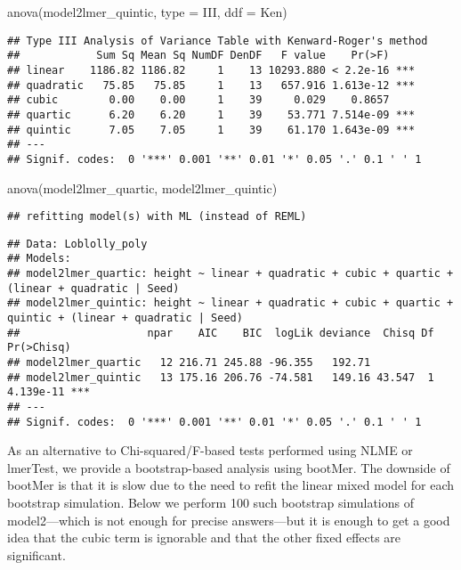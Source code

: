 \documentclass[
]{book}
\newenvironment{Shaded}{\begin{snugshade}}{\end{snugshade}}
\newcommand{\AttributeTok}[1]{\textcolor[rgb]{0.77,0.63,0.00}{#1}}
\newcommand{\FunctionTok}[1]{\textcolor[rgb]{0.00,0.00,0.00}{#1}}
\newcommand{\NormalTok}[1]{#1}
\newcommand{\StringTok}[1]{\textcolor[rgb]{0.31,0.60,0.02}{#1}}
\begin{document}
\begin{Shaded}
\begin{Highlighting}[]
\FunctionTok{anova}\NormalTok{(model2lmer\_quintic, }\AttributeTok{type =} \StringTok{\textquotesingle{}III\textquotesingle{}}\NormalTok{, }\AttributeTok{ddf =} \StringTok{\textquotesingle{}Ken\textquotesingle{}}\NormalTok{)}
\end{Highlighting}
\end{Shaded}

\begin{verbatim}
## Type III Analysis of Variance Table with Kenward-Roger's method
##            Sum Sq Mean Sq NumDF DenDF   F value    Pr(>F)    
## linear    1186.82 1186.82     1    13 10293.880 < 2.2e-16 ***
## quadratic   75.85   75.85     1    13   657.916 1.613e-12 ***
## cubic        0.00    0.00     1    39     0.029    0.8657    
## quartic      6.20    6.20     1    39    53.771 7.514e-09 ***
## quintic      7.05    7.05     1    39    61.170 1.643e-09 ***
## ---
## Signif. codes:  0 '***' 0.001 '**' 0.01 '*' 0.05 '.' 0.1 ' ' 1
\end{verbatim}

\begin{Shaded}
\begin{Highlighting}[]
\FunctionTok{anova}\NormalTok{(model2lmer\_quartic, model2lmer\_quintic)}
\end{Highlighting}
\end{Shaded}

\begin{verbatim}
## refitting model(s) with ML (instead of REML)
\end{verbatim}

\begin{verbatim}
## Data: Loblolly_poly
## Models:
## model2lmer_quartic: height ~ linear + quadratic + cubic + quartic + (linear + quadratic | Seed)
## model2lmer_quintic: height ~ linear + quadratic + cubic + quartic + quintic + (linear + quadratic | Seed)
##                    npar    AIC    BIC  logLik deviance  Chisq Df Pr(>Chisq)    
## model2lmer_quartic   12 216.71 245.88 -96.355   192.71                         
## model2lmer_quintic   13 175.16 206.76 -74.581   149.16 43.547  1  4.139e-11 ***
## ---
## Signif. codes:  0 '***' 0.001 '**' 0.01 '*' 0.05 '.' 0.1 ' ' 1
\end{verbatim}

As an alternative to Chi-squared/F-based tests performed using NLME or lmerTest, we provide a bootstrap-based analysis using bootMer. The downside of bootMer is that it is slow due to the need to refit the linear mixed model for each bootstrap simulation. Below we perform 100 such bootstrap simulations of model2---which is not enough for precise answers---but it is enough to get a good idea that the cubic term is ignorable and that the other fixed effects are significant.
\end{document}
